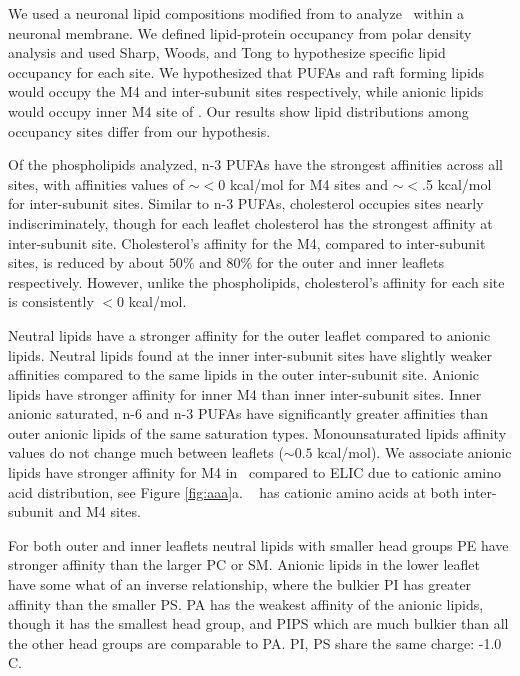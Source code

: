 \label{con}

 
We used a neuronal lipid compositions modified from\cite{Ingolfsson2017b} to analyze \nachr~within a neuronal membrane. We defined lipid-protein occupancy from polar density analysis and used Sharp\cite{Sharp2019}, Woods\cite{Woods2019}, and Tong\cite{Tong2019} to hypothesize specific lipid occupancy for each site. We hypothesized that PUFAs and raft forming lipids would occupy the M4 and inter-subunit sites respectively, while anionic lipids would occupy inner M4 site of \nachr. Our results show lipid distributions among occupancy sites differ from our hypothesis.

Of the phospholipids analyzed, n-3 PUFAs have the strongest affinities across all sites, with affinities values of $\sim<0$ kcal/mol for M4 sites and $\sim<$.5 kcal/mol for inter-subunit sites. Similar to n-3 PUFAs, cholesterol occupies sites nearly indiscriminately, though for each leaflet cholesterol has the strongest affinity at inter-subunit site. Cholesterol's affinity for the M4, compared to inter-subunit sites, is reduced by about $50\%$ and $80\%$ for the outer and inner leaflets respectively. However, unlike the phospholipids, cholesterol's affinity for each site is consistently $<0$ kcal/mol. 

Neutral lipids have a stronger affinity for the outer leaflet compared to anionic lipids. Neutral lipids found at the inner inter-subunit sites have slightly weaker affinities compared to the same lipids in the outer inter-subunit site. Anionic lipids have stronger affinity for inner M4 than inner inter-subunit sites. Inner anionic saturated, n-6 and n-3 PUFAs have significantly greater affinities than outer anionic lipids of the same saturation types. Monounsaturated lipids affinity values do not change much between leaflets ($\sim 0.5$ kcal/mol). We associate anionic lipids have stronger affinity for M4 in \nachr~compared to ELIC due to cationic amino acid distribution, see Figure \ref{fig:aaa}a. \nachr~ has cationic amino acids at both inter-subunit and M4 sites.

For both outer and inner leaflets neutral lipids with smaller head groups PE have stronger affinity than the larger PC or SM. Anionic lipids in the lower leaflet have some what of an inverse relationship, where the bulkier PI has greater affinity than the smaller PS.  PA has the weakest affinity of the anionic lipids, though it has the smallest head group, and PIPS which are much bulkier than all the other head groups are comparable to PA. PI, PS  share the same charge: -1.0 C.

